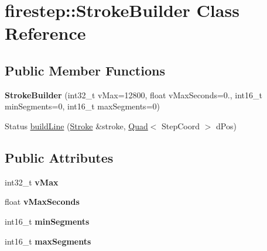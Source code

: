 \hypertarget{classfirestep_1_1_stroke_builder}{\section{firestep\+:\+:Stroke\+Builder Class Reference}
\label{classfirestep_1_1_stroke_builder}
}
\subsection*{Public Member Functions}
\begin{DoxyCompactItemize}
\item 
\hypertarget{classfirestep_1_1_stroke_builder_acf6d9a65cacf66f5570485866e9c98a7}{{\bfseries Stroke\+Builder} (int32\+\_\+t v\+Max=12800, float v\+Max\+Seconds=0., int16\+\_\+t min\+Segments=0, int16\+\_\+t max\+Segments=0)}\label{classfirestep_1_1_stroke_builder_acf6d9a65cacf66f5570485866e9c98a7}

\item 
Status \hyperlink{classfirestep_1_1_stroke_builder_a24e49b2f3dce062201bffc50e387179f}{build\+Line} (\hyperlink{classfirestep_1_1_stroke}{Stroke} \&stroke, \hyperlink{classfirestep_1_1_quad}{Quad}$<$ Step\+Coord $>$ d\+Pos)
\end{DoxyCompactItemize}
\subsection*{Public Attributes}
\begin{DoxyCompactItemize}
\item 
\hypertarget{classfirestep_1_1_stroke_builder_adf2373e742a16c7c8b2d6d483d0770e6}{int32\+\_\+t {\bfseries v\+Max}}\label{classfirestep_1_1_stroke_builder_adf2373e742a16c7c8b2d6d483d0770e6}

\item 
\hypertarget{classfirestep_1_1_stroke_builder_abe594e40d2d7880cc54c7a52a1f1dd4f}{float {\bfseries v\+Max\+Seconds}}\label{classfirestep_1_1_stroke_builder_abe594e40d2d7880cc54c7a52a1f1dd4f}

\item 
\hypertarget{classfirestep_1_1_stroke_builder_ad6ba092a82a1f2e51454d534fe7a9a57}{int16\+\_\+t {\bfseries min\+Segments}}\label{classfirestep_1_1_stroke_builder_ad6ba092a82a1f2e51454d534fe7a9a57}

\item 
\hypertarget{classfirestep_1_1_stroke_builder_afda030dbed4139af1ec75f43c4c5efa4}{int16\+\_\+t {\bfseries max\+Segments}}\label{classfirestep_1_1_stroke_builder_afda030dbed4139af1ec75f43c4c5efa4}

\end{DoxyCompactItemize}


